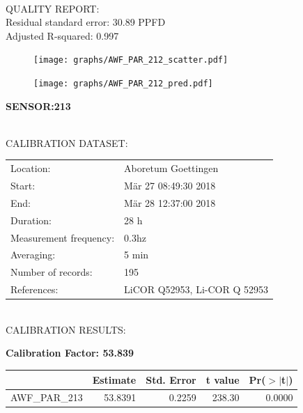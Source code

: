 \documentclass[oneside]{report}
\begin{document}
\hrulefill\\
QUALITY REPORT:\\
Residual standard error: 30.89 PPFD\\
Adjusted R-squared: 0.997



\begin{figure}[H]
  \centering
  \texttt{[image: graphs/AWF\_PAR\_212\_scatter.pdf]}
\end{figure}




\begin{figure}[H]
  \centering
  \texttt{[image: graphs/AWF\_PAR\_212\_pred.pdf]}
\end{figure}

\pagebreak


\begin{center}
\large{\textbf{SENSOR:213}}\\
\end{center}

\hrulefill\\
CALIBRATION DATASET:\\
\begin{table}[h!]
  \centering
  \label{tab:table1}
  \begin{tabular}{ll}
    Location: & Aboretum Goettingen\\ 
    
    
    Start:  & Mär 27 08:49:30 2018 \\
    End:   & Mär 28 12:37:00 2018\\ 
    Duration: & 28 h\\
    Measurement frequency: & 0.3hz\\
    Averaging:  &5 min\\
    Number of records: & 195 \\
    References: & LiCOR Q52953, Li-COR Q 52953 \\
  \end{tabular}
\end{table}

\hrulefill\\
CALIBRATION RESULTS:\\


\begin{center}
\textbf{\large{Calibration Factor: 53.839}}\\
\end{center}
\begin{table}[ht]
\centering
\begin{tabular}{rrrrr}
  \hline
 & Estimate & Std. Error & t value & Pr($>$$|$t$|$) \\ 
  \hline
AWF\_PAR\_213 & 53.8391 & 0.2259 & 238.30 & 0.0000 \\ 
   \hline
\end{tabular}
\end{table}
\end{document}

